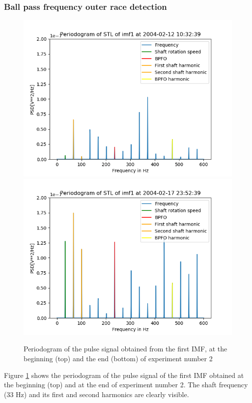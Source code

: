 \documentclass[../Main/thesis.tex]{subfiles}
\begin{document}
\subsubsection{Ball pass frequency outer race detection} 
 \begin{figure}[H]
 	\centering
 	\includegraphics[width=0.8\linewidth]{../fig/periodogram_bpfo/start_imf1_bpfo}
 	\includegraphics[width=0.8\linewidth]{../fig/periodogram_bpfo/end_imf1_bpfo}
 	\caption{Periodogram of the pulse signal obtained from the first IMF, at the beginning (top) and the end (bottom) of experiment number 2}
 	\label{fig:startimf1bpfo}
 \end{figure}
\justify
Figure \ref{fig:startimf1bpfo} shows the periodogram of the pulse signal of the first IMF obtained at the beginning (top) and at the end of experiment number 2. The shaft frequency (33 Hz) and its first and second harmonics are clearly visible.
\end{document}
